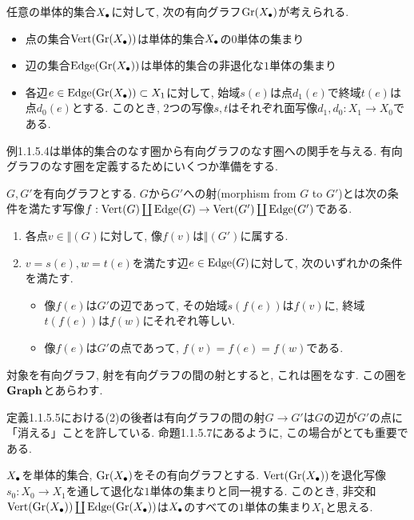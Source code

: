 \documentclass[uplatex, a4paper, 14Q, dvipdfmx]{jsreport}
\begin{document}
\begin{example}
  任意の単体的集合$X_\bullet$に対して, 次の有向グラフ$\mathrm{Gr}(X_\bullet)$が考えられる.
  \begin{itemize}
    \item 点の集合$\mathrm{Vert}(\mathrm{Gr}(X_\bullet))$は単体的集合$X_\bullet$の$0$単体の集まり 
    \item 辺の集合$\mathrm{Edge}(\mathrm{Gr}(X_\bullet))$は単体的集合の非退化な$1$単体の集まり 
    \item 各辺$e \in \mathrm{Edge}(\mathrm{Gr}(X_\bullet)) \subset X_1$に対して, 始域$s(e)$は点$d_1(e)$で終域$t(e)$は点$d_0(e)$とする.
    このとき, 2つの写像$s,t$はそれぞれ面写像$d_1,d_0: X_1 \to X_0$である.
  \end{itemize}
\end{example}

例1.1.5.4は単体的集合のなす圏から有向グラフのなす圏への関手を与える. 
有向グラフのなす圏を定義するためにいくつか準備をする. 

\begin{definition}
  $G,G'$を有向グラフとする. 
  $G$から$G'$への射(morphism from $G$ to $G'$)とは次の条件を満たす写像$f: \mathrm{Vert}(G) \coprod \mathrm{Edge}(G) \to \mathrm{Vert}(G') \coprod \mathrm{Edge}(G')$である. 
  \begin{enumerate}
    \item 各点$v \in \Vert(G)$に対して, 像$f(v)$は$\Vert(G')$に属する. 
    \item $v=s(e), w=t(e)$を満たす辺$e \in \mathrm{Edge}(G)$に対して, 次のいずれかの条件を満たす. 
    \begin{itemize}
      \item 像$f(e)$は$G'$の辺であって, その始域$s(f(e))$は$f(v)$に, 終域$t(f(e))$は$f(w)$にそれぞれ等しい. 
      \item 像$f(e)$は$G'$の点であって, $f(v)=f(e)=f(w)$である. 
    \end{itemize}
  \end{enumerate}
\end{definition}

対象を有向グラフ, 射を有向グラフの間の射とすると, これは圏をなす. 
この圏を$\mathbf{Graph}$とあらわす. 

\begin{remark}
  定義1.1.5.5における(2)の後者は有向グラフの間の射$G \to G'$は$G$の辺が$G'$の点に「消える」ことを許している. 
  命題1.1.5.7にあるように, この場合がとても重要である. 
\end{remark}

$X_\bullet$を単体的集合, $\mathrm{Gr}(X_\bullet)$をその有向グラフとする. 
$\mathrm{Vert}(\mathrm{Gr}(X_\bullet))$を退化写像$s_0: X_0 \to X_1$を通して退化な$1$単体の集まりと同一視する. 
このとき, 非交和$\mathrm{Vert}(\mathrm{Gr}(X_\bullet)) \coprod \mathrm{Edge}(\mathrm{Gr}(X_\bullet))$は$X_\bullet$のすべての$1$単体の集まり$X_1$と思える. 
\end{document}
